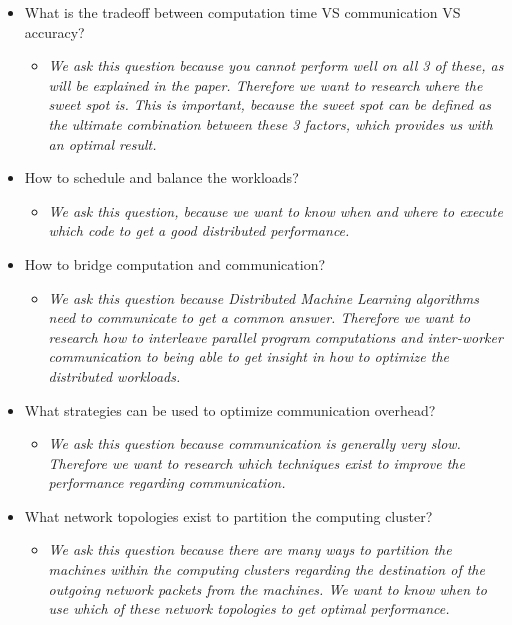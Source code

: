 \begin{itemize}
\begin{itemize}
\begin{itemize}
			\item What is the tradeoff between computation time VS communication VS accuracy?
			\begin{itemize}
				\item \textit{We ask this question because you cannot perform well on all 3 of these, as will be explained in the paper. Therefore we want to research where the sweet spot is. This is important, because the sweet spot can be defined as the ultimate combination between these 3 factors, which provides us with an optimal result.}
			\end{itemize}
			\item How to schedule and balance the workloads?
			\begin{itemize}
				\item \textit{We ask this question, because we want to know when and where to execute which code to get a good distributed performance.}
			\end{itemize}
			\item How to bridge computation and communication?
			\begin{itemize}
				\item \textit{We ask this question because Distributed Machine Learning algorithms need to communicate to get a common answer. Therefore we want to research how to interleave parallel program computations and inter-worker communication to being able to get insight in how to optimize the distributed workloads.}
			\end{itemize}
			\item What strategies can be used to optimize communication overhead?
			\begin{itemize}
				\item \textit{We ask this question because communication is generally very slow. Therefore we want to research which techniques exist to improve the performance regarding communication.}
			\end{itemize}
			\item What network topologies exist to partition the computing cluster?
			\begin{itemize}
				\item \textit{We ask this question because there are many ways to partition the machines within the computing clusters regarding the destination of the outgoing network packets from the machines. We want to know when to use which of these network topologies to get optimal performance.}
			\end{itemize}
		\end{itemize}

\end{itemize}
\end{itemize}
